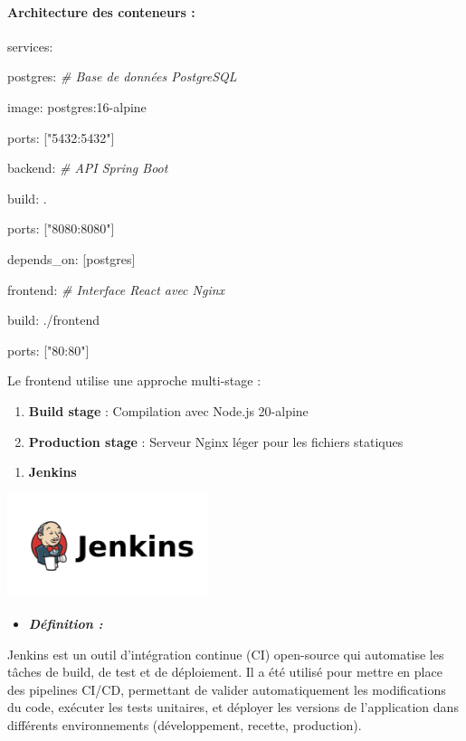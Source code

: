 \documentclass[12pt,a4paper,twoside,openright]{report}
\begin{document}
\hypertarget{architecture-des-conteneurs}{%
\paragraph{Architecture des conteneurs
:}\label{architecture-des-conteneurs}}

services:

postgres: \emph{\# Base de données PostgreSQL}

image: postgres:16-alpine

ports: {[}"5432:5432"{]}

backend: \emph{\# API Spring Boot}

build: .

ports: {[}"8080:8080"{]}

depends\_on: {[}postgres{]}

frontend: \emph{\# Interface React avec Nginx}

build: ./frontend

ports: {[}"80:80"{]}

Le frontend utilise une approche multi-stage :

\begin{enumerate}
\def\labelenumi{\arabic{enumi}.}
\item
  \textbf{Build stage} : Compilation avec Node.js 20-alpine
\item
  \textbf{Production stage} : Serveur Nginx léger pour les fichiers
  statiques
\end{enumerate}

\begin{enumerate}
\def\labelenumi{\Alph{enumi}.}
\setcounter{enumi}{1}
\item
  \textbf{Jenkins}
\end{enumerate}

\includegraphics[width=2.30833in,height=1.20625in]{latex_media/media/image39.png}

\begin{itemize}
\item
  \emph{\textbf{Définition :}}
\end{itemize}

Jenkins est un outil d'intégration continue (CI) open-source qui
automatise les tâches de build, de test et de déploiement. Il a été
utilisé pour mettre en place des pipelines CI/CD, permettant de valider
automatiquement les modifications du code, exécuter les tests unitaires,
et déployer les versions de l'application dans différents environnements
(développement, recette, production).
\end{document}
